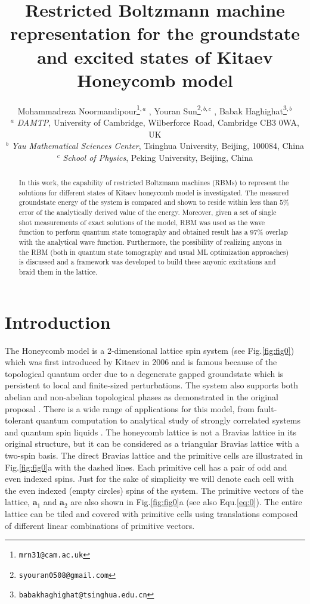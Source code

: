 \documentclass{article}
\title{Restricted Boltzmann machine representation for the groundstate and excited states of Kitaev Honeycomb model}
\author{
    Mohammadreza Noormandipour\thanks{\texttt{mrn31@cam.ac.uk}}\hspace{1mm}$^{,a}$ , Youran Sun\thanks{\texttt{syouran0508@gmail.com}}\hspace{1mm}$^{,b,c}$ , Babak Haghighat\thanks{\texttt{babakhaghighat@tsinghua.edu.cn}}\hspace{1mm}$^{,b}$ \\
	$^{a}$ \textit{DAMTP}, University of Cambridge, Wilberforce Road, Cambridge CB3 0WA, UK \\
	$^{b}$ \textit{Yau Mathematical Sciences Center}, Tsinghua University, Beijing, 100084, China\\
	$^{c}$ \textit{School of Physics},
Peking University, Beijing, China\\
}
\begin{document}
\maketitle

\begin{abstract}
In this work, the capability of restricted Boltzmann machines (RBMs) to represent the solutions for different states of Kitaev honeycomb model is investigated. The measured groundstate energy of the system is compared and shown to reside within less than $5\%$ error of the analytically derived value of the energy. Moreover, given a set of single shot measurements of exact solutions of the model, RBM was used as the wave function to perform quantum state tomography and obtained result has a $97\%$ overlap with the analytical wave function. Furthermore, the possibility of realizing anyons in the RBM (both in quantum state tomography and usual ML optimization approaches) is discussed and a framework was developed to build these anyonic excitations and braid them in the lattice. 
\end{abstract}




\section{Introduction}
The Honeycomb model is a 2-dimensional lattice spin system (see Fig.\hspace{0.2mm}\ref{fig:fig0}) which was first introduced by Kitaev in 2006 \cite{Kitaev_2006} and is famous because of the topological quantum order due to a degenerate gapped groundstate which is persistent to local and finite-sized perturbations. The system also supports both abelian and non-abelian topological phases as demonstrated in the original proposal \cite{Kitaev_2006}. There is a wide range of applications for this model, from fault-tolerant quantum computation \cite{Kitaev_2003} to analytical study of strongly correlated systems \cite{Jackeli_2009} and quantum spin liquids \cite{Tikhonov_2011}. The honeycomb lattice is not a Bravias lattice in its original structure, but it can be considered as a triangular Bravias lattice with a two-spin basis. The direct Bravias lattice and the primitive cells are illustrated in Fig.\hspace{0.2mm}\ref{fig:fig0}a with the dashed lines. Each primitive cell has a pair of odd and even indexed spins. Just for the sake of simplicity we will denote each cell with the even indexed (empty circles) spins of the system. The primitive vectors of the lattice, $\textbf{a}_1$ and $\textbf{a}_2$ are also shown in Fig.\hspace{0.2mm}\ref{fig:fig0}a (see also Equ.\hspace{0.2mm}\ref{eq:0}). The entire lattice can be tiled and covered with primitive cells using translations composed of different linear combinations of primitive vectors. 
\end{document}
